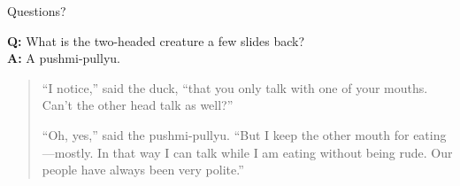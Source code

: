\documentclass[12pt]{beamer}
\begin{document}
\begin{frame}{Questions?}
  \vspace{4.5cm}

  \footnotesize
  \textbf{Q:} What is the two-headed creature a few slides back?\\
  \textbf{A:} A pushmi-pullyu.

  \begin{quote}
    ``I notice,'' said the duck, ``that you only talk with one of your
    mouths. Can't the other head talk as well?''

    ``Oh, yes,'' said the pushmi-pullyu. ``But I keep the other mouth
    for eating---mostly. In that way I can talk while I am eating
    without being rude. Our people have always been very polite.''
  \end{quote}
\end{frame}
\end{document}
